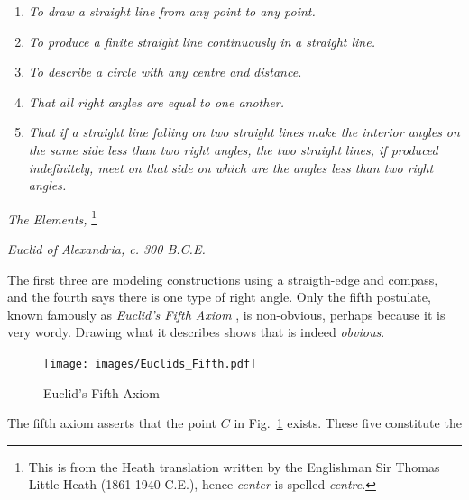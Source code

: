         \begin{center}
            \begin{enumerate}
                \item \textit{To draw a straight line from any point}
                      \textit{to any point.}
                \item \textit{To produce a finite straight line continuously in}
                      \textit{a straight line.}
                \item \textit{To describe a circle with any centre and}
                      \textit{distance.}
                \item \textit{That all right angles are equal to one another.}
                \item \textit{That if a straight line falling on two straight}
                      \textit{lines make the interior angles on the same side}
                      \textit{less than two right angles, the two straight}
                      \textit{lines, if produced indefinitely, meet on that}
                      \textit{side on which are the angles less than two right}
                      \textit{angles.}
            \end{enumerate}
            \hfill\textit{The Elements,}%
            \footnote{%
                This is from the Heath translation written by the Englishman
                Sir Thomas Little Heath
                (1861-1940 C.E.), hence \textit{center} is spelled
                \textit{centre}.
            }\par
            \hfill\textit{Euclid of Alexandria, c. 300 B.C.E.}
        \end{center}
        The first three are modeling constructions using a straigth-edge and
        compass, and the fourth says there is one type of right angle. Only the
        fifth postulate, known famously as \textit{Euclid's Fifth Axiom}%
        , is non-obvious, perhaps because it is very
        wordy. Drawing what it describes shows that is indeed \textit{obvious}.
        \begin{figure}[H]
            \centering
            \captionsetup{type=figure}
            \texttt{[image: images/Euclids\_Fifth.pdf]}
            \caption{Euclid's Fifth Axiom}
            \label{fig:Euclids_Fifth_Axiom}
        \end{figure}
        The fifth axiom asserts that the point $C$ in
        Fig.~\ref{fig:Euclids_Fifth_Axiom} exists. These five constitute the
